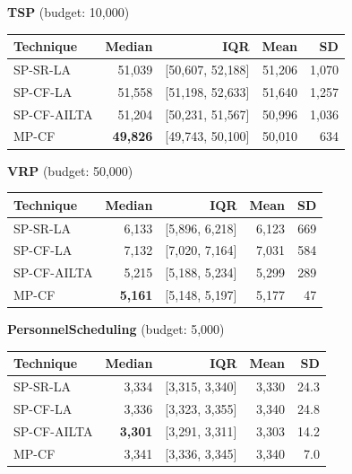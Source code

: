 \documentclass[11pt,a4paper]{article}
\begin{document}
\textbf{TSP} (budget: 10{,}000)

\begin{table}[H]
\centering
\small
\begin{tabular}{lrrrr}
\toprule
Technique & Median & IQR & Mean & SD \\
\midrule
SP-SR-LA & 51{,}039 & [50{,}607, 52{,}188] & 51{,}206 & 1{,}070 \\
SP-CF-LA & 51{,}558 & [51{,}198, 52{,}633] & 51{,}640 & 1{,}257 \\
SP-CF-AILTA & 51{,}204 & [50{,}231, 51{,}567] & 50{,}996 & 1{,}036 \\
MP-CF & \textbf{49{,}826} & [49{,}743, 50{,}100] & 50{,}010 & 634 \\
\bottomrule
\end{tabular}
\end{table}

\textbf{VRP} (budget: 50{,}000)

\begin{table}[H]
\centering
\small
\begin{tabular}{lrrrr}
\toprule
Technique & Median & IQR & Mean & SD \\
\midrule
SP-SR-LA & 6{,}133 & [5{,}896, 6{,}218] & 6{,}123 & 669 \\
SP-CF-LA & 7{,}132 & [7{,}020, 7{,}164] & 7{,}031 & 584 \\
SP-CF-AILTA & 5{,}215 & [5{,}188, 5{,}234] & 5{,}299 & 289 \\
MP-CF & \textbf{5{,}161} & [5{,}148, 5{,}197] & 5{,}177 & 47 \\
\bottomrule
\end{tabular}
\end{table}

\textbf{PersonnelScheduling} (budget: 5{,}000)

\begin{table}[H]
\centering
\small
\begin{tabular}{lrrrr}
\toprule
Technique & Median & IQR & Mean & SD \\
\midrule
SP-SR-LA & 3{,}334 & [3{,}315, 3{,}340] & 3{,}330 & 24.3 \\
SP-CF-LA & 3{,}336 & [3{,}323, 3{,}355] & 3{,}340 & 24.8 \\
SP-CF-AILTA & \textbf{3{,}301} & [3{,}291, 3{,}311] & 3{,}303 & 14.2 \\
MP-CF & 3{,}341 & [3{,}336, 3{,}345] & 3{,}340 & 7.0 \\
\bottomrule
\end{tabular}
\end{table}
\end{document}
